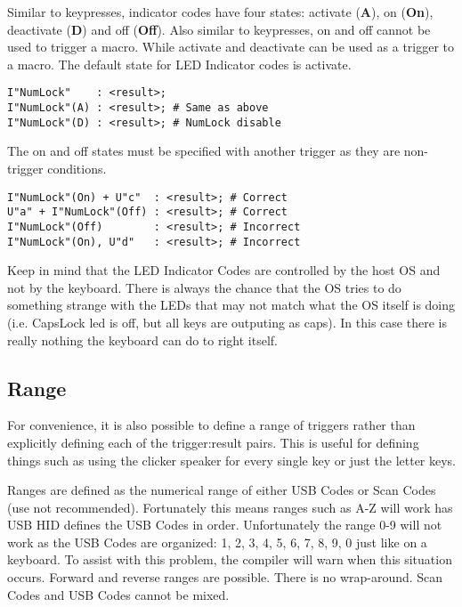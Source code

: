 \documentclass{kiibohd-template}
\begin{document}
Similar to keypresses, indicator codes have four states: activate (\textbf{A}), on (\textbf{On}), deactivate (\textbf{D}) and off (\textbf{Off}).
Also similar to keypresses, on and off cannot be used to trigger a macro.
While activate and deactivate can be used as a trigger to a macro.
The default state for LED Indicator codes is activate.

\begin{lstlisting}
I"NumLock"    : <result>;
I"NumLock"(A) : <result>; # Same as above
I"NumLock"(D) : <result>; # NumLock disable
\end{lstlisting}

The on and off states must be specified with another trigger as they are non-trigger conditions.

\begin{lstlisting}
I"NumLock"(On) + U"c"  : <result>; # Correct
U"a" + I"NumLock"(Off) : <result>; # Correct
I"NumLock"(Off)        : <result>; # Incorrect
I"NumLock"(On), U"d"   : <result>; # Incorrect
\end{lstlisting}

Keep in mind that the LED Indicator Codes are controlled by the host OS and not by the keyboard.
There is always the chance that the OS tries to do something strange with the LEDs that may not match what the OS itself is doing (i.e. CapsLock led is off, but all keys are outputing as caps).
In this case there is really nothing the keyboard can do to right itself.


\subsection{Range}

For convenience, it is also possible to define a range of triggers rather than explicitly defining each of the trigger:result pairs.
This is useful for defining things such as using the clicker speaker for every single key or just the letter keys.

Ranges are defined as the numerical range of either USB Codes or Scan Codes (use not recommended).
Fortunately this means ranges such as A-Z will work has USB HID defines the USB Codes in order.
Unfortunately the range 0-9 will not work as the USB Codes are organized: 1, 2, 3, 4, 5, 6, 7, 8, 9, 0 just like on a keyboard.
To assist with this problem, the compiler will warn when this situation occurs.
Forward and reverse ranges are possible.
There is no wrap-around.
Scan Codes and USB Codes cannot be mixed.
\end{document}
